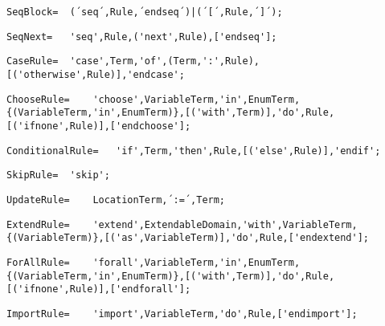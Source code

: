 \documentclass{article}
\begin{document}
    \begin{lstlisting}[mathescape=true]
     SeqBlock= 	(´seq´,Rule,´endseq´)|(´[´,Rule,´]´);
    \end{lstlisting}
    
    \begin{lstlisting}[mathescape=true]
     SeqNext= 	'seq',Rule,('next',Rule),['endseq'];
    \end{lstlisting}
    
    \begin{lstlisting}[mathescape=true]
     CaseRule= 	'case',Term,'of',(Term,':',Rule),[('otherwise',Rule)],'endcase';
    \end{lstlisting}
    
    \begin{lstlisting}[mathescape=true]
     ChooseRule= 	'choose',VariableTerm,'in',EnumTerm,{(VariableTerm,'in',EnumTerm)},[('with',Term)],'do',Rule,[('ifnone',Rule)],['endchoose'];
    \end{lstlisting}
    
    \begin{lstlisting}[mathescape=true]
     ConditionalRule= 	'if',Term,'then',Rule,[('else',Rule)],'endif';
    \end{lstlisting}
    
    \begin{lstlisting}[mathescape=true]
     SkipRule= 	'skip';
    \end{lstlisting}
    
    \begin{lstlisting}[mathescape=true]
     UpdateRule= 	LocationTerm,´:=´,Term;
    \end{lstlisting}
    
    \begin{lstlisting}[mathescape=true]
     ExtendRule= 	'extend',ExtendableDomain,'with',VariableTerm,{(VariableTerm)},[('as',VariableTerm)],'do',Rule,['endextend'];
    \end{lstlisting}
    
    \begin{lstlisting}[mathescape=true]
     ForAllRule= 	'forall',VariableTerm,'in',EnumTerm,{(VariableTerm,'in',EnumTerm)},[('with',Term)],'do',Rule,[('ifnone',Rule)],['endforall'];
    \end{lstlisting}
    
    \begin{lstlisting}[mathescape=true]
     ImportRule= 	'import',VariableTerm,'do',Rule,['endimport'];
    \end{lstlisting}
    
\end{document}
